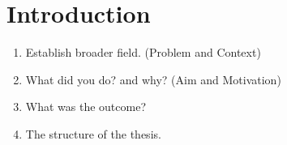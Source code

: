 \chapter{Introduction}\label{cha:intro}
\begin{enumerate}
    \item Establish broader field. (Problem and Context)
    \item What did you do? and why? (Aim and Motivation)
    \item What was the outcome?
    \item The structure of the thesis.
\end{enumerate}
